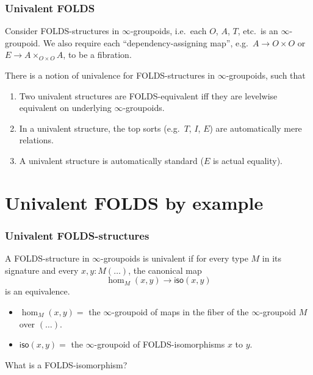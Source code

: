 \documentclass{beamer}
\begin{document}
\begin{frame}
  \frametitle{Univalent FOLDS}
  Consider FOLDS-structures in $\infty$-groupoids, i.e.\ each $O$, $A$, $T$, etc.\ is an $\infty$-groupoid.
  We also require each ``dependency-assigning map'', e.g.\ $A \to O\times O$ or $E\to A\times_{O\times O} A$, to be a fibration.
  \begin{theorem}[in progress]
    There is a notion of \alert{univalence} for FOLDS-structures in $\infty$-groupoids, such that
    \begin{enumerate}
    \item Two univalent structures are FOLDS-equivalent iff they are levelwise equivalent on underlying $\infty$-groupoids.
    \item In a univalent structure, the top sorts (e.g.\ $T$, $I$, $E$) are {automatically} mere relations.
    \item A univalent structure is automatically standard ($E$ is actual equality).
    \end{enumerate}
  \end{theorem}
\end{frame}

\section{Univalent FOLDS by example}
\label{sec:univalent-folds-eg}

\begin{frame}
  \frametitle{Univalent FOLDS-structures}
  \begin{definition}
    A FOLDS-structure in $\infty$-groupoids is \alert<1>{univalent} if for every type $M$ in its signature and every $x,y:M(\dots)$, the canonical map
    \[ \hom_M(x,y) \to \mathsf{iso}(x,y) \]
    is an equivalence.
  \end{definition}
  \pause
  \begin{itemize}
  \item $\hom_M(x,y)=$ the $\infty$-groupoid of maps in the fiber of the $\infty$-groupoid $M$ over $(\dots)$.
  \item $\mathsf{iso}(x,y)=$ the $\infty$-groupoid of \alert{FOLDS-isomorphisms} $x$ to $y$.
  \end{itemize}
  What is a FOLDS-isomorphism?
\end{frame}
\end{document}
